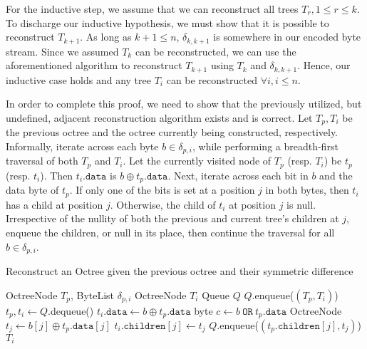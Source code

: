 \documentclass[twoside,twocolumn]{article}
\begin{document}
For the inductive step, we assume that we can reconstruct all trees $T_r, 1 \leq r \leq k$. To discharge
our inductive hypothesis, we must show that it is possible to reconstruct $T_{k+1}$. As long as
$k + 1 \leq n$, $\delta_{k,k+1}$ is somewhere in our encoded byte stream. Since we assumed $T_k$ can be
reconstructed, we can use the aforementioned algorithm to reconstruct $T_{k+1}$ using $T_k$ and
$\delta_{k,k+1}$. Hence, our inductive case holds and any tree $T_i$ can be reconstructed
$\forall i, i \leq n$.

In order to complete this proof, we need to show that the previously utilized, but undefined,
adjacent reconstruction algorithm exists and is correct. Let $T_p, T_i$ be the previous octree and the
octree currently being constructed, respectively. Informally, iterate across each byte $b \in \delta_{p,i}$,
while performing a breadth-first traversal of both $T_p$ and $T_i$. Let the currently visited node
of $T_p$ (resp. $T_i$) be $t_p$ (resp. $t_i$). Then $t_i.\mathtt{data}$ is $b \oplus t_p.\mathtt{data}$.
Next, iterate across each bit in $b$ and the data byte of $t_p$.
If only one of the bits is set at a position $j$ in both bytes, then $t_i$ has a child at position $j$.
Otherwise, the child of $t_i$ at position $j$ is null. Irrespective of the nullity of both the previous
and current tree's children at $j$, enqueue the children, or null in its place, then continue the
traversal for all $b \in \delta_{p,i}$.

\begin{algorithm}[h]
\small
\caption{Reconstruct an Octree given the previous octree and their symmetric difference}
\label{alg:Reconstruct}
\begin{algorithmic}[1]
 {OctreeNode $T_p$, ByteList $\delta_{p,i}$}
  \State OctreeNode $T_i$
  \State Queue $Q$
  \State $Q$.enqueue($(T_p, T_i)$)
    \State $t_p, t_i \gets Q$.dequeue()
    \State $t_i.\mathtt{data} \gets b \oplus t_p.\mathtt{data}$
    \State byte $c \gets b \ \mathtt{OR} \ t_p.\mathtt{data}$
      \State OctreeNode $t_j \gets b[j] \oplus t_p.\mathtt{data}[j]$
      \State $t_i.\mathtt{children}[j] \gets t_j$
      \State $Q.$enqueue($(t_p.\mathtt{children}[j], t_j)$)
    \EndFor
  \EndFor
  \State \Return $T_i$
\EndProcedure
\Statex
\end{algorithmic}
\vspace{-0.4cm}
\end{algorithm}
\end{document}
